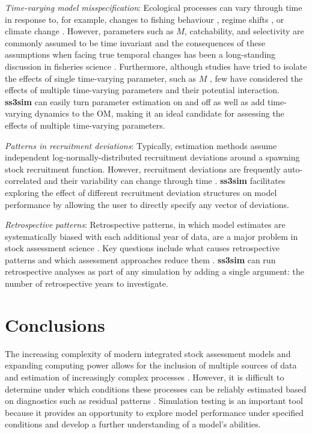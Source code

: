 \documentclass[11pt]{article}
\begin{document}
\begin{spacing}{1.2}
\emph{Time-varying model misspecification}: Ecological processes can vary
through time in response to, for example, changes to fishing behaviour
\cite{hilborn1992}, regime shifts \cite{vert-pre2013}, or climate change
\cite{walther2002}. However, parameters such as $M$, catchability, and
selectivity are commonly assumed to be time invariant and the consequences of
these assumptions when facing true temporal changes has been a long-standing
discussion in fisheries science \cite{royama1992, wilberg2006, fu2001}.
Furthermore, although studies have tried to isolate the effects of single
time-varying parameter, such as $M$ \cite{lee2011, jiao2012, deroba2013,
  johnson2014}, few have considered the effects of multiple time-varying
parameters and their potential interaction. \textbf{ss3sim} can easily turn
parameter estimation on and off as well as add time-varying dynamics to the OM,
making it an ideal candidate for assessing the effects of multiple time-varying
parameters.

\emph{Patterns in recruitment deviations}: Typically, estimation methods assume
independent log-normally-distributed recruitment deviations around a spawning
stock recruitment function. However, recruitment deviations are frequently
auto-correlated and their variability can change through time
\cite{beamish1995, pyper1998}. \textbf{ss3sim} facilitates exploring the
effect of different recruitment deviation structures on model performance by
allowing the user to directly specify any vector of deviations.

\emph{Retrospective patterns}: Retrospective patterns, in which model estimates
are systematically biased with each additional year of data, are a major
problem in stock assessment science \cite{mohn1999, legault2008}. Key questions
include what causes retrospective patterns and which assessment approaches reduce
them \cite{legault2008}. \textbf{ss3sim} can run retrospective analyses as part
of any simulation by adding a single argument: the number of retrospective
years to investigate.

\section*{Conclusions}

The increasing complexity of modern integrated stock assessment models and
expanding computing power allows for the inclusion of multiple sources of data
and estimation of increasingly complex processes \cite{maunder2013}. However,
it is difficult to determine under which conditions these processes can be
reliably estimated based on diagnostics such as residual patterns
\cite{maunder2013}. Simulation testing is an important tool because it provides
an opportunity to explore model performance under specified conditions and
develop a further understanding of a model's abilities.


\end{spacing}
\end{document}
